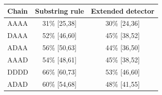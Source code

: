 \begin{tabular}{lcc}\toprule
Chain & Substring rule & Extended detector\\\midrule
AAAA & 31\% {\scriptsize[25,38]} & 30\% {\scriptsize[24,36]}\\
DAAA & 52\% {\scriptsize[46,60]} & 45\% {\scriptsize[38,52]}\\
ADAA & 56\% {\scriptsize[50,63]} & 44\% {\scriptsize[36,50]}\\
AAAD & 54\% {\scriptsize[48,61]} & 45\% {\scriptsize[38,52]}\\
DDDD & 66\% {\scriptsize[60,73]} & 53\% {\scriptsize[46,60]}\\
ADAD & 60\% {\scriptsize[54,68]} & 48\% {\scriptsize[41,55]}\\
\bottomrule\end{tabular}
